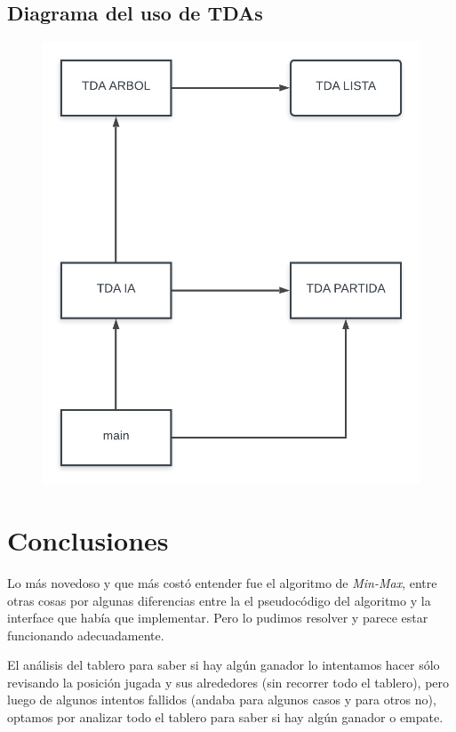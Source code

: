 \documentclass[12pt,a4paper]{article}
\begin{document}
\subsection{Diagrama del uso de TDAs}
\begin{figure}[h!tbp]
	\centering
		\includegraphics[width=1.00\textwidth]{diagrama.jpg}
	\label{fig:diagrama}
\end{figure}

\newpage
\section{Conclusiones}
Lo m\'as novedoso y que m\'as cost\'o entender fue el algoritmo de \emph{Min-Max}, entre otras cosas por algunas diferencias entre la el pseudoc\'odigo del algoritmo y la interface que hab\'ia que implementar. Pero lo pudimos resolver y parece estar funcionando adecuadamente.

El an\'alisis del tablero para saber si hay alg\'un ganador lo intentamos hacer s\'olo revisando la posici\'on jugada y sus alrededores (sin recorrer todo el tablero), pero luego de algunos intentos fallidos (andaba para algunos casos y para otros no), optamos por analizar todo el tablero para saber si hay alg\'un ganador o empate.
\end{document}
